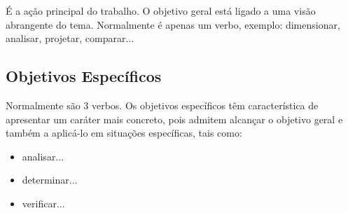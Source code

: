 É a ação principal do trabalho. O objetivo geral está ligado a uma visão abrangente do
tema. Normalmente é apenas um verbo, exemplo: dimensionar, analisar, projetar, comparar...
\subsection{Objetivos Específicos}
\label{objetivosespecificos}

Normalmente são 3 verbos. Os objetivos específicos têm característica de apresentar
um caráter mais concreto, pois admitem alcançar o objetivo geral e também a aplicá-lo em
situações específicas, tais como:

\begin{itemize}
    \item analisar...
    \item determinar...  
    \item verificar...
\end{itemize}
